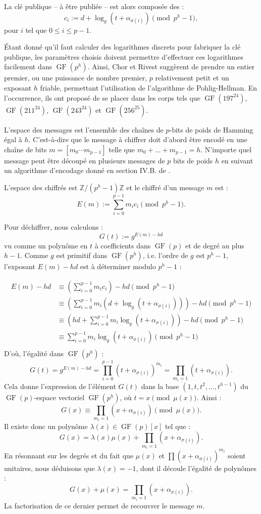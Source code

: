 \documentclass[a4paper, titlepage, 11pt]{article}
\theoremstyle{definition}
\theoremstyle{remark}
\def\Z{\mathbb Z}
\def\gf{\operatorname{GF}}
\begin{document}
La clé publique -- à être publiée -- est alors composée des :
$$c_i := d + \log_g\left(t + \alpha_{\sigma(i)}\right) \pmod{p^h-1},$$
pour $i$ tel que $0 \leqslant i \leqslant p-1$. 

\'Etant donné qu'il faut calculer des logarithmes discrets pour fabriquer la clé publique, les paramètres choisis doivent permettre d'effectuer ces logarithmes facilement dans $\gf(p^h)$. Ainsi, Chor et Rivest suggèrent de prendre un entier premier, ou une puissance de nombre premier, $p$ relativement petit et un exposant $h$ friable, permettant l'utilisation de l'algorithme de Pohlig-Hellman. En l’occurrence, ils ont proposé de se placer dans les corps tels que $\gf(197^{24})$, $\gf(211^{24})$, $\gf(243^{24})$ et $\gf(256^{25})$.

L'espace des messages est l'ensemble des chaînes de $p$-bits de poids de Hamming égal à $h$. C'est-à-dire que le message à chiffrer doit d'abord être encodé en une chaîne de bits $m = [m_0\cdots m_{p-1}]$ telle que $m_0+\dots + m_{p-1} = h$. N'importe quel message peut être découpé en plusieurs messages de $p$ bits de poids $h$ en suivant un algorithme d'encodage donné en section IV.B. de \cite{chorRivest1988}.

L'espace des chiffrés est $\Z/(p^h-1)\Z$ et le chiffré d'un message $m$ est :
$$E(m) := \sum_{i=0}^{p-1} m_ic_i \pmod{p^h-1}.$$

Pour déchiffrer, nous calculons :
$$G(t) := g^{E(m) - hd}$$
vu comme un polynôme en $t$ à coefficients dans $\gf(p)$ et de degré au plus $h-1$. Comme $g$ est primitif dans $\gf(p^h)$, i.e. l'ordre de $g$ est $p^h-1$, l'exposant $E(m) - hd$ est à déterminer modulo $p^h-1$ :

\begin{align*}
E(m) - hd &\equiv \left(\sum_{i=0}^{p-1} m_ic_i\right) - hd \pmod{p^h-1} \\
&\equiv \left(\sum_{i=0}^{p-1} m_i\left(d + \log_g\left(t + \alpha_{\sigma(i)}\right)\right)\right) - hd \pmod{p^h-1} \\
&\equiv \left(hd + \sum_{i=0}^{p-1} m_i\log_g\left(t + \alpha_{\sigma(i)}\right)\right) - hd \pmod{p^h-1} \\
&\equiv  \sum_{i=0}^{p-1} m_i\log_g\left(t + \alpha_{\sigma(i)}\right) \pmod{p^h-1} \\
\end{align*}
D'où, l'égalité dans $\gf(p^h)$ : 
$$G(t) = g^{E(m) - hd} = \prod_{i=0}^{p-1} \left(t+\alpha_{\sigma(i)}\right)^{m_i} = \prod_{m_i = 1} \left(t+\alpha_{\sigma(i)}\right).$$
Cela donne l'expression de l'élément $G(t)$ dans la base $(1,t,t^2, \dots, t^{h-1})$ du $\gf(p)$-espace vectoriel $\gf(p^h)$, où $t = x \pmod{\mu(x)}$. Ainsi :
$$G(x) \equiv \prod_{m_i = 1} \left(x+\alpha_{\sigma(i)}\right) \pmod{\mu(x)}.$$
Il existe donc un polynôme $\lambda(x) \in \gf(p)[x]$ tel que : $$G(x) = \lambda(x) \mu(x) + \prod_{m_i = 1} \left(x+\alpha_{\sigma(i)}\right).$$
En résonnant sur les degrés et du fait que $\mu(x)$ et $\prod \left(x+\alpha_{\sigma(i)}\right)^{m_i}$ soient unitaires, nous déduisons que $\lambda(x) = -1$, dont il découle l'égalité de polynômes :
$$G(x) + \mu(x) = \prod_{m_i = 1} \left(x+\alpha_{\sigma(i)}\right).$$
La factorisation de ce dernier permet de recouvrer le message $m$.
\end{document}
